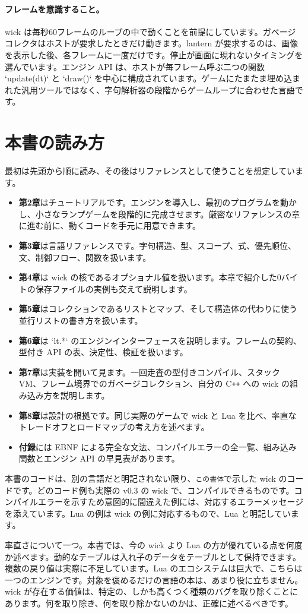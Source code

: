 \paragraph{フレームを意識すること。} wick は毎秒60フレームのループの中で動くことを前提にしています。ガベージコレクタはホストが要求したときだけ動きます。lantern が要求するのは、画像を表示した後、各フレームに一度だけです。停止が画面に現れないタイミングを選んでいます。エンジン API は、ホストが毎フレーム呼ぶ二つの関数 `update(dt)` と `draw()` を中心に構成されています。ゲームにたまたま埋め込まれた汎用ツールではなく、字句解析器の段階からゲームループに合わせた言語です。

\section{本書の読み方}

最初は先頭から順に読み、その後はリファレンスとして使うことを想定しています。

\begin{itemize}
\item \textbf{第2章}はチュートリアルです。エンジンを導入し、最初のプログラムを動かし、小さなランプゲームを段階的に完成させます。厳密なリファレンスの章に進む前に、動くコードを手元に用意できます。
\item \textbf{第3章}は言語リファレンスです。字句構造、型、スコープ、式、優先順位、文、制御フロー、関数を扱います。
\item \textbf{第4章}は wick の核であるオプショナル値を扱います。本章で紹介した0バイトの保存ファイルの実例も交えて説明します。
\item \textbf{第5章}はコレクションであるリストとマップ、そして構造体の代わりに使う並行リストの書き方を扱います。
\item \textbf{第6章}は `lt.*` のエンジンインターフェースを説明します。フレームの契約、型付き API の表、決定性、検証を扱います。
\item \textbf{第7章}は実装を開いて見ます。一回走査の型付きコンパイル、スタック VM、フレーム境界でのガベージコレクション、自分の \mbox{C\texttt{++}} への wick の組み込み方を説明します。
\item \textbf{第8章}は設計の根拠です。同じ実際のゲームで wick と Lua を比べ、率直なトレードオフとロードマップの考え方を述べます。
\item \textbf{付録}には EBNF による完全な文法、コンパイルエラーの全一覧、組み込み関数とエンジン API の早見表があります。
\end{itemize}

本書のコードは、別の言語だと明記されない限り、\texttt{この書体}で示した wick のコードです。どのコード例も実際の v0.3 の wick で、コンパイルできるものです。コンパイルエラーを示すため意図的に間違えた例には、対応するエラーメッセージを添えています。Lua の例は wick の例に対応するもので、Lua と明記しています。

率直さについて一つ。本書では、今の wick より Lua の方が優れている点を何度か述べます。動的なテーブルは入れ子のデータをテーブルとして保持できます。複数の戻り値は実際に不足しています。Lua のエコシステムは巨大で、こちらは一つのエンジンです。対象を褒めるだけの言語の本は、あまり役に立ちません。wick が存在する価値は、特定の、しかも高くつく種類のバグを取り除くことにあります。何を取り除き、何を取り除かないのかは、正確に述べるべきです。
